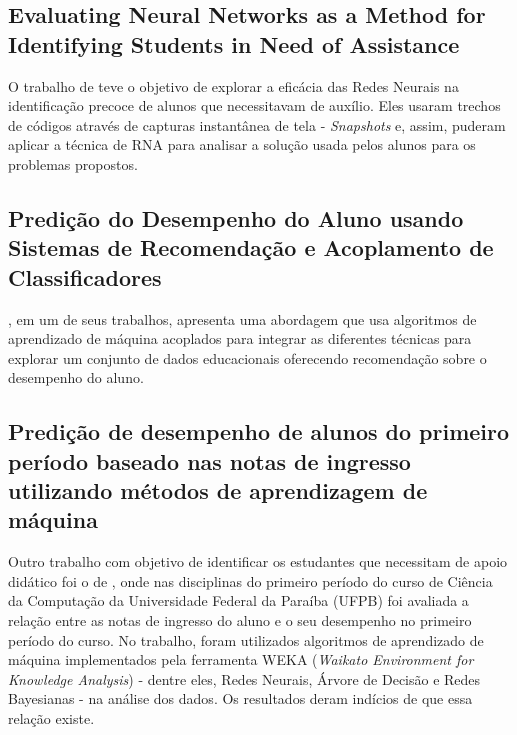 \documentclass[
	12pt,				%
	openright,			%
	oneside,
	a4paper,			%
	english,			%
	french,				%
	spanish,			%
	brazil,				%
	]{abntex2}
\begin{document}
\subsection{Evaluating Neural Networks as a Method for Identifying Students in Need of Assistance}
\label{sec:Evaluating}
O trabalho de  teve o objetivo de explorar a eficácia das Redes Neurais na identificação precoce de alunos que necessitavam de auxílio. Eles usaram trechos de códigos através de capturas instantânea de tela - \textit{Snapshots} e, assim, puderam aplicar a técnica de RNA para analisar a solução usada pelos alunos para os problemas propostos.

\subsection{Predição do Desempenho do Aluno usando Sistemas de Recomendação e Acoplamento de Classificadores}
\label{sec:Pred1}
, em um de seus trabalhos, apresenta uma abordagem que usa algoritmos de aprendizado de máquina acoplados para integrar as diferentes técnicas para explorar um conjunto de dados educacionais oferecendo recomendação sobre o desempenho do aluno.

\subsection{Predição de desempenho de alunos do primeiro período baseado nas notas de ingresso utilizando métodos de aprendizagem de máquina}
\label{sec:Pred2}
Outro trabalho com objetivo de identificar os estudantes que necessitam de apoio didático foi o de , onde nas disciplinas do primeiro período do curso de Ciência da Computação da Universidade Federal da Paraíba (UFPB) foi avaliada a relação entre as notas de ingresso do aluno e o seu desempenho no primeiro período do curso. No trabalho, foram utilizados algoritmos de aprendizado de máquina implementados pela ferramenta WEKA (\textit{Waikato Environment for Knowledge Analysis}) - dentre eles, Redes Neurais, Árvore de Decisão e Redes Bayesianas - na análise dos dados. Os resultados deram indícios de que essa relação existe.
\end{document}
